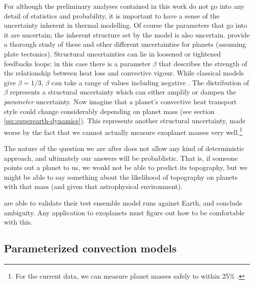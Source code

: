 For although the preliminary analyses contained in this work do not go into any detail of statistics and probability, it is important to have a sense of the uncertainty inherent in thermal modelling. Of course the parameters that go into it are uncertain; the inherent structure set by the model is also uncertain. \citet{Seales2020} provide a thorough study of these and other different uncertainties for planets (assuming plate tectonics). Structural uncertainties can lie in loosened or tightened feedbacks loops: in this case there is a parameter $\beta$ that describes the strength of the relationship between heat loss and convective vigour. While classical models give $\beta = 1/3$, $\beta$ can take a range of values including negative \citep{Korenaga2003}. The distribution of $\beta$ represents a structural uncertainty which can either amplify or dampen the \textit{parameter} uncertainty. Now imagine that a planet's convective heat transport style could change considerably depending on planet mass (see section \ref{sec:superearth-dynamics}). This represents another structural uncertainty, made worse by the fact that we cannot actually measure exoplanet masses very well.\footnote{For the current data, we can measure planet masses safely to within 25\% \citep{Otegi2019}.} 

The nature of the question we are after does not allow any kind of deterministic approach, and ultimately our answers will be probablistic. That is, if someone points out a planet to us, we would not be able to predict its topography, but we might be able to say something about the likelihood of topography on planets with that mass (and given that astrophysical environment).


\citet{Seales2020} are able to validate their test ensemble model runs against Earth, and conclude ambiguity. Any application to exoplanets must figure out how to be comfortable with this. %

\subsection{Parameterized convection models}

